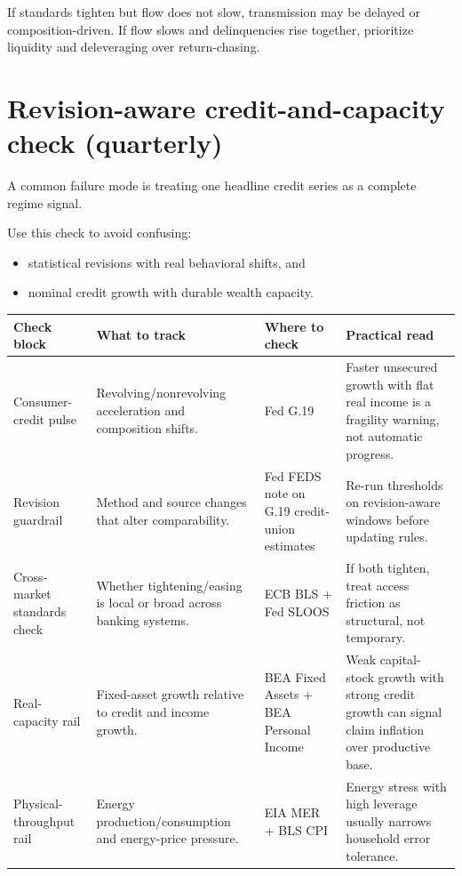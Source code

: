 \documentclass[11pt,openany]{book}
\begin{document}
If standards tighten but flow does not slow, transmission may be delayed or composition-driven. If flow slows and delinquencies rise together, prioritize liquidity and deleveraging over return-chasing.

\section{Revision-aware credit-and-capacity check (quarterly)}

A common failure mode is treating one headline credit series as a complete regime signal.

Use this check to avoid confusing:
\begin{itemize}
  \item statistical revisions with real behavioral shifts, and
  \item nominal credit growth with durable wealth capacity.
\end{itemize}

\begin{center}
\small
\begin{tabularx}{\textwidth}{>{\raggedright\arraybackslash}p{}>{\raggedright\arraybackslash}p{}>{\raggedright\arraybackslash}p{}X}
\toprule
\textbf{Check block} & \textbf{What to track} & \textbf{Where to check} & \textbf{Practical read} \\
\midrule
Consumer-credit pulse & Revolving/nonrevolving acceleration and composition shifts. & Fed G.19 & Faster unsecured growth with flat real income is a fragility warning, not automatic progress. \\
Revision guardrail & Method and source changes that alter comparability. & Fed FEDS note on G.19 credit-union estimates & Re-run thresholds on revision-aware windows before updating rules. \\
Cross-market standards check & Whether tightening/easing is local or broad across banking systems. & ECB BLS + Fed SLOOS & If both tighten, treat access friction as structural, not temporary. \\
Real-capacity rail & Fixed-asset growth relative to credit and income growth. & BEA Fixed Assets + BEA Personal Income & Weak capital-stock growth with strong credit growth can signal claim inflation over productive base. \\
Physical-throughput rail & Energy production/consumption and energy-price pressure. & EIA MER + BLS CPI & Energy stress with high leverage usually narrows household error tolerance. \\
\bottomrule
\end{tabularx}
\normalsize
\end{center}
\end{document}
